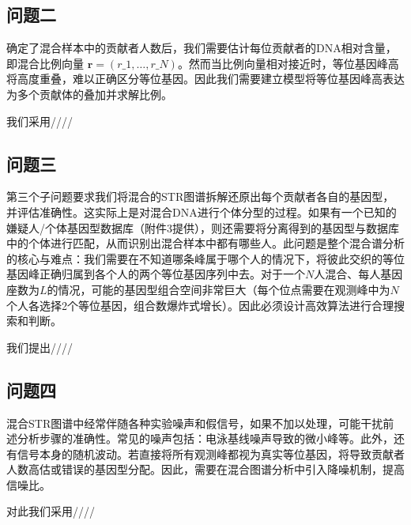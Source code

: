 \subsection[\hspace{-2pt}问题二]{{\heiti{} \hspace{-8pt}问题二}}\label{section1: 问题二}
确定了混合样本中的贡献者人数后，我们需要估计每位贡献者的DNA相对含量，即混合比例向量 $\mathbf{r}=(r\_1,\dots,r\_N)$。然而当比例向量相对接近时，等位基因峰高将高度重叠，难以正确区分等位基因。因此我们需要建立模型将等位基因峰高表达为多个贡献体的叠加并求解比例。

我们采用////
\subsection[\hspace{-2pt}问题三]{{\heiti{} \hspace{-8pt}问题三}}\label{section1: 问题三}
第三个子问题要求我们将混合的STR图谱拆解还原出每个贡献者各自的基因型，并评估准确性。这实际上是对混合DNA进行个体分型的过程。如果有一个已知的嫌疑人/个体基因型数据库（附件3提供），则还需要将分离得到的基因型与数据库中的个体进行匹配，从而识别出混合样本中都有哪些人。此问题是整个混合谱分析的核心与难点：我们需要在不知道哪条峰属于哪个人的情况下，将彼此交织的等位基因峰正确归属到各个人的两个等位基因序列中去。对于一个$N$人混合、每人基因座数为$L$的情况，可能的基因型组合空间非常巨大（每个位点需要在观测峰中为$N$个人各选择2个等位基因，组合数爆炸式增长）。因此必须设计高效算法进行合理搜索和判断。

我们提出////
\subsection[\hspace{-2pt}问题四]{{\heiti{} \hspace{-8pt}问题四}}\label{section1: 问题四}
混合STR图谱中经常伴随各种实验噪声和假信号，如果不加以处理，可能干扰前述分析步骤的准确性。常见的噪声包括：电泳基线噪声导致的微小峰等。此外，还有信号本身的随机波动。若直接将所有观测峰都视为真实等位基因，将导致贡献者人数高估或错误的基因型分配。因此，需要在混合图谱分析中引入降噪机制，提高信噪比。

对此我们采用////
